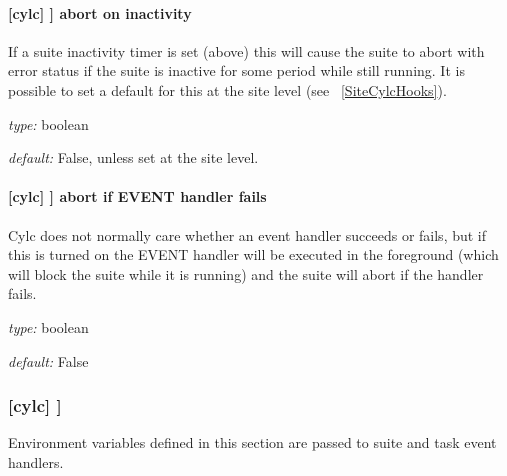 \paragraph[abort on inactivity]{[cylc] \textrightarrow [[events]] \textrightarrow abort on inactivity}

If a suite inactivity timer is set (above) this will cause the suite to abort
with error status if the suite is inactive for some period while still running.
It is possible to set a default for this at the site level
(see ~\ref{SiteCylcHooks}).

\begin{myitemize}
    \item {\em type:} boolean
    \item {\em default:} False, unless set at the site level.
\end{myitemize}

\paragraph[abort if startup handler fails]{[cylc] \textrightarrow [[events]] \textrightarrow abort if EVENT handler fails}

Cylc does not normally care whether an event handler succeeds or fails,
but if this is turned on the EVENT handler will be executed in the
foreground (which will block the suite while it is running) and the
suite will abort if the handler fails.

\begin{myitemize}
    \item {\em type:} boolean
    \item {\em default:} False
\end{myitemize}

\subsubsection[{[[}environment{]]} ]{[cylc] \textrightarrow [[environment]]}

Environment variables defined in this section are passed to suite and
task event handlers.

